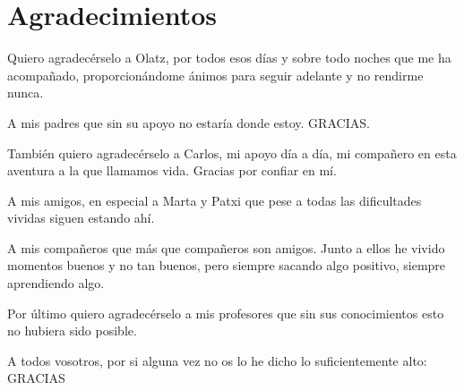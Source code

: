 
\chapter*{Agradecimientos}

Quiero agradecérselo a Olatz, por todos esos días y sobre todo noches que me ha acompañado, proporcionándome ánimos para seguir adelante y no rendirme nunca.

A mis padres que sin su apoyo no estaría donde estoy. GRACIAS.

También quiero agradecérselo a Carlos, mi apoyo día a día, mi compañero en esta aventura a la que llamamos vida. Gracias por confiar en mí. 

A mis amigos, en especial a Marta y Patxi que pese a todas las dificultades vividas siguen estando ahí.

A mis compañeros que más que compañeros son amigos. Junto a ellos he vivido momentos buenos y no tan buenos, pero siempre sacando algo positivo, siempre aprendiendo algo.

Por último quiero agradecérselo a mis profesores que sin sus conocimientos esto no hubiera sido posible.

A todos vosotros, por si alguna vez no os lo he dicho lo suficientemente alto: GRACIAS



